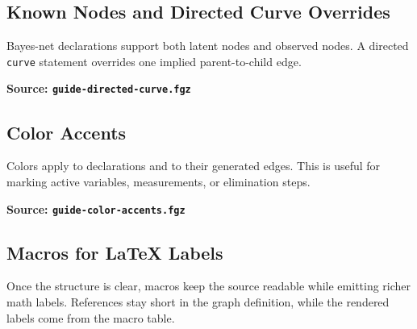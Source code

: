 \documentclass{article}
\begin{document}
\subsection{Known Nodes and Directed Curve Overrides}
Bayes-net declarations support both latent nodes and observed nodes. A directed
\texttt{curve} statement overrides one implied parent-to-child edge.

\begin{samepage}
  \noindent
  \begin{minipage}[t]{0.41\textwidth}
    \centering
    \vspace{0.5cm}
    
  \end{minipage}\hfill
  \begin{minipage}[t]{0.55\textwidth}
    \textbf{Source: \texttt{guide-directed-curve.fgz}}
  \end{minipage}
\end{samepage}

\subsection{Color Accents}
Colors apply to declarations and to their generated edges. This is useful for marking
active variables, measurements, or elimination steps.

\begin{samepage}
  \noindent
  \begin{minipage}[t]{0.41\textwidth}
    \centering
    \vspace{0.5cm}
    
  \end{minipage}\hfill
  \begin{minipage}[t]{0.55\textwidth}
    \textbf{Source: \texttt{guide-color-accents.fgz}}
  \end{minipage}
\end{samepage}

\subsection{Macros for LaTeX Labels}
Once the structure is clear, macros keep the source readable while emitting richer math
labels. References stay short in the graph definition, while the rendered labels come
from the macro table.
\end{document}
